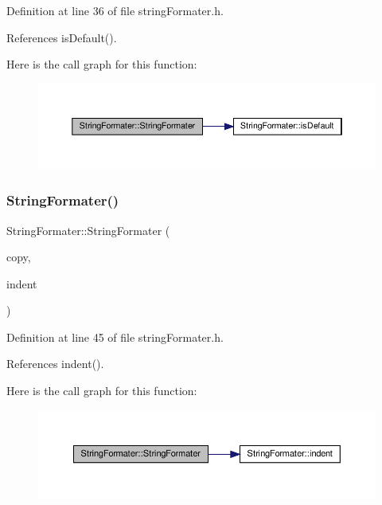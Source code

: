 Definition at line 36 of file string\+Formater.\+h.



References is\+Default().

Here is the call graph for this function\+:
\nopagebreak
\begin{figure}[H]
\begin{center}
\leavevmode
\includegraphics[width=350pt]{classStringFormater_a91a7cfa34811723d7b934c1d22def6a8_cgraph}
\end{center}
\end{figure}
\mbox{\label{classStringFormater_a9fd21580941b514287b9ec15ddc665ea}} 
\subsubsection{\texorpdfstring{String\+Formater()}{StringFormater()}\hspace{0.1cm}{\footnotesize\ttfamily [3/3]}}
{\footnotesize\ttfamily String\+Formater\+::\+String\+Formater (\begin{DoxyParamCaption}\item[{const \hyperlink{classStringFormater}{String\+Formater} \&}]{copy,  }\item[{const int}]{indent }\end{DoxyParamCaption})\hspace{0.3cm}{\ttfamily [inline]}}



Definition at line 45 of file string\+Formater.\+h.



References indent().

Here is the call graph for this function\+:
\nopagebreak
\begin{figure}[H]
\begin{center}
\leavevmode
\includegraphics[width=350pt]{classStringFormater_a9fd21580941b514287b9ec15ddc665ea_cgraph}
\end{center}
\end{figure}


